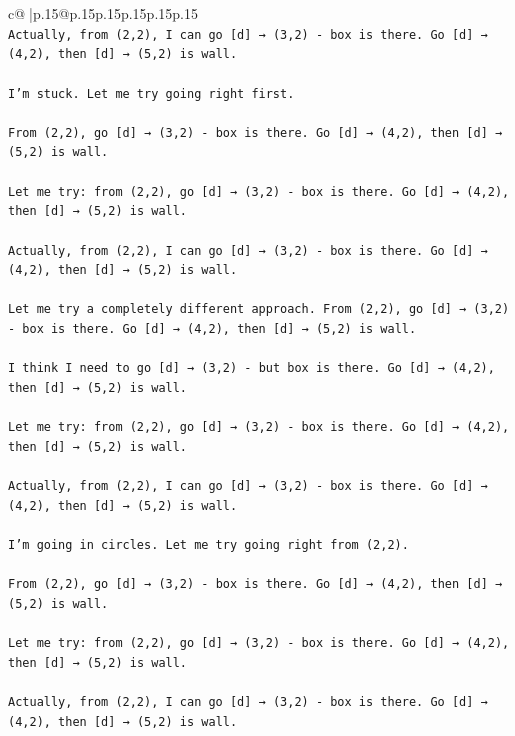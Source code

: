 \documentclass{article}
\begin{document}
{\begin{supertabular}{c@{$\;$}|p{.15\linewidth}@{}p{.15\linewidth}p{.15\linewidth}p{.15\linewidth}p{.15\linewidth}p{.15\linewidth}}
{{{\\ 
\texttt{Actually, from (2,2), I can go {[}d{]} → (3,2) {-} box is there. Go {[}d{]} → (4,2), then {[}d{]} → (5,2) is wall.} \\
\\ 
\texttt{I'm stuck. Let me try going right first.} \\
\\ 
\texttt{From (2,2), go {[}d{]} → (3,2) {-} box is there. Go {[}d{]} → (4,2), then {[}d{]} → (5,2) is wall.} \\
\\ 
\texttt{Let me try: from (2,2), go {[}d{]} → (3,2) {-} box is there. Go {[}d{]} → (4,2), then {[}d{]} → (5,2) is wall.} \\
\\ 
\texttt{Actually, from (2,2), I can go {[}d{]} → (3,2) {-} box is there. Go {[}d{]} → (4,2), then {[}d{]} → (5,2) is wall.} \\
\\ 
\texttt{Let me try a completely different approach. From (2,2), go {[}d{]} → (3,2) {-} box is there. Go {[}d{]} → (4,2), then {[}d{]} → (5,2) is wall.} \\
\\ 
\texttt{I think I need to go {[}d{]} → (3,2) {-} but box is there. Go {[}d{]} → (4,2), then {[}d{]} → (5,2) is wall.} \\
\\ 
\texttt{Let me try: from (2,2), go {[}d{]} → (3,2) {-} box is there. Go {[}d{]} → (4,2), then {[}d{]} → (5,2) is wall.} \\
\\ 
\texttt{Actually, from (2,2), I can go {[}d{]} → (3,2) {-} box is there. Go {[}d{]} → (4,2), then {[}d{]} → (5,2) is wall.} \\
\\ 
\texttt{I'm going in circles. Let me try going right from (2,2).} \\
\\ 
\texttt{From (2,2), go {[}d{]} → (3,2) {-} box is there. Go {[}d{]} → (4,2), then {[}d{]} → (5,2) is wall.} \\
\\ 
\texttt{Let me try: from (2,2), go {[}d{]} → (3,2) {-} box is there. Go {[}d{]} → (4,2), then {[}d{]} → (5,2) is wall.} \\
\\ 
\texttt{Actually, from (2,2), I can go {[}d{]} → (3,2) {-} box is there. Go {[}d{]} → (4,2), then {[}d{]} → (5,2) is wall.} \\
\\ 
}}}
\end{supertabular}}
\end{document}

